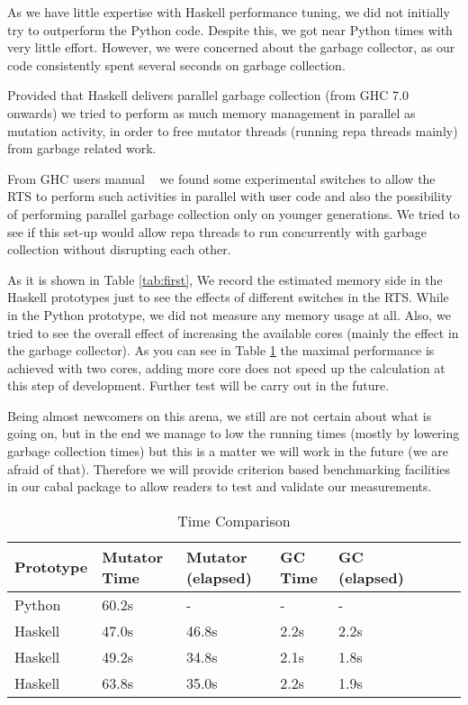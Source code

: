 \documentclass{tmr}
\begin{document}
As we have little expertise with Haskell performance tuning, we did not initially try to outperform the Python
code.  Despite this, we got near Python times with very little effort.
However, we were concerned about the garbage collector, as our code
consistently spent several seconds on garbage collection.


Provided that Haskell
delivers parallel garbage collection (from GHC 7.0 onwards) we tried to perform as much memory management in parallel
as mutation activity, in order to free mutator threads (running repa threads mainly) from garbage related work.

From GHC users manual ~\cite{ghc} we found some experimental switches to allow the RTS to perform such activities in parallel
with user code and also the possibility of performing parallel garbage collection only on younger generations.
We tried to see if this set-up would allow repa threads to run concurrently with garbage collection without  
disrupting each other.

As it is shown in Table \ref{tab:first}, We record the estimated memory side in the 
Haskell prototypes just to see the effects of different switches in the RTS. While in the Python
prototype, we did not measure any memory usage at all. Also, we tried to see the overall effect of 
increasing the available cores (mainly the effect in the garbage collector). As you can see in Table
\ref{tab:second} the maximal performance is achieved with two cores, adding more core does not speed up
the calculation at this step of development. Further test will be carry out in the future.

Being almost newcomers on this arena, we still are not certain about what is going on,
but in the end we manage to low the running times (mostly by lowering garbage collection times)
but this is a matter we will work in the future (we are afraid of that). Therefore we will
provide criterion based benchmarking facilities in our cabal package to allow 
readers to test and validate our measurements.

\begin{table}[float,captionpos=b,belowcaptionskip=4pt]
\begin{center}
    \begin{tabular}{ | l | l | l | l | l | l | l| l |}
\hline  Prototype  & Mutator Time & Mutator (elapsed) & GC Time & GC (elapsed) \\ 
\hline  Python   & 60.2s   & -      & -    & - \\
\hline  Haskell  & 47.0s   & 46.8s  & 2.2s & 2.2s \\
\hline  Haskell  & 49.2s   & 34.8s  & 2.1s & 1.8s \\
\hline  Haskell  & 63.8s   & 35.0s  & 2.2s & 1.9s  \\
\hline
    \end{tabular} 
\end{center}
\label{tab:second}
\caption{Time Comparison}
\end{table}
\end{document}
